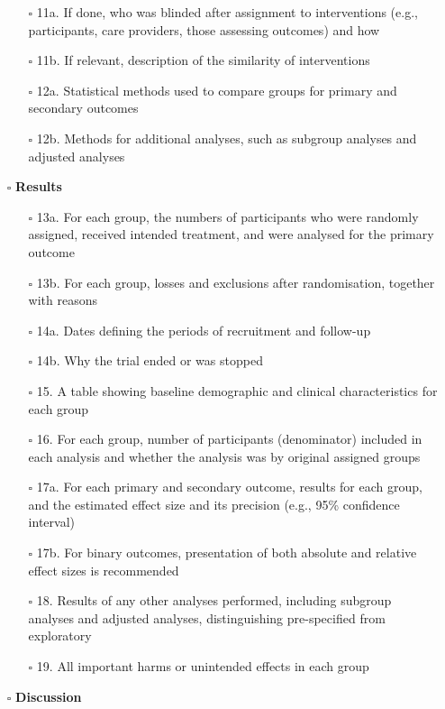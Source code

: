 \documentclass[11pt]{article}
\def\tightlist{}
\begin{document}
\begin{Form}
\begin{itemize}
\begin{itemize}
  \item[$\square$]
    11a. If done, who was blinded after assignment to interventions
    (e.g., participants, care providers, those assessing outcomes) and
    how
  \item[$\square$]
    11b. If relevant, description of the similarity of interventions
  \item[$\square$]
    12a. Statistical methods used to compare groups for primary and
    secondary outcomes
  \item[$\square$]
    12b. Methods for additional analyses, such as subgroup analyses and
    adjusted analyses
  \end{itemize}
\item[$\square$]
  \textbf{Results}

  \begin{itemize}
  \tightlist
  \item[$\square$]
    13a. For each group, the numbers of participants who were randomly
    assigned, received intended treatment, and were analysed for the
    primary outcome
  \item[$\square$]
    13b. For each group, losses and exclusions after randomisation,
    together with reasons
  \item[$\square$]
    14a. Dates defining the periods of recruitment and follow-up
  \item[$\square$]
    14b. Why the trial ended or was stopped
  \item[$\square$]
    15. A table showing baseline demographic and clinical
    characteristics for each group
  \item[$\square$]
    16. For each group, number of participants (denominator) included in
    each analysis and whether the analysis was by original assigned
    groups
  \item[$\square$]
    17a. For each primary and secondary outcome, results for each group,
    and the estimated effect size and its precision (e.g., 95\%
    confidence interval)
  \item[$\square$]
    17b. For binary outcomes, presentation of both absolute and relative
    effect sizes is recommended
  \item[$\square$]
    18. Results of any other analyses performed, including subgroup
    analyses and adjusted analyses, distinguishing pre-specified from
    exploratory
  \item[$\square$]
    19. All important harms or unintended effects in each group
  \end{itemize}
\item[$\square$]
  \textbf{Discussion}


\end{itemize}
\end{Form}
\end{document}
